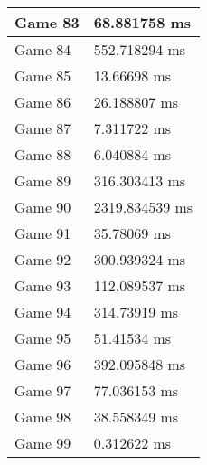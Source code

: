 \begin{tabular}{|l|l|}
	Game 83 & 68.881758 ms \\ \hline
	Game 84 & 552.718294 ms \\ \hline
	Game 85 & 13.66698 ms \\ \hline
	Game 86 & 26.188807 ms \\ \hline
	Game 87 & 7.311722 ms \\ \hline
	Game 88 & 6.040884 ms \\ \hline
	Game 89 & 316.303413 ms \\ \hline
	Game 90 & 2319.834539 ms \\ \hline
	Game 91 & 35.78069 ms \\ \hline
	Game 92 & 300.939324 ms \\ \hline
	Game 93 & 112.089537 ms \\ \hline
	Game 94 & 314.73919 ms \\ \hline
	Game 95 & 51.41534 ms \\ \hline
	Game 96 & 392.095848 ms \\ \hline
	Game 97 & 77.036153 ms \\ \hline
	Game 98 & 38.558349 ms \\ \hline
	Game 99 & 0.312622 ms \\ \hline
\end{tabular}
